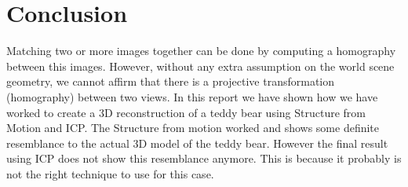 \section{Conclusion}
\label{conclusion}

Matching two or more images together can be done by computing a homography between this images.
However, without any extra assumption on the world scene geometry, we cannot affirm that there is a projective transformation (homography) between two views.
In this report we have shown how we have worked to create a 3D reconstruction of a teddy bear using Structure from Motion and ICP.
The Structure from motion worked and shows some definite resemblance to the actual 3D model of the teddy bear.
However the final result using ICP does not show this resemblance anymore.
This is because it probably is not the right technique to use for this case.
